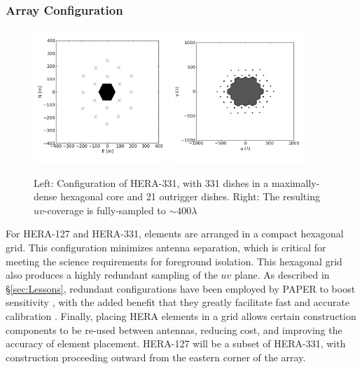\documentclass[preprint]{aastex}
\begin{document}
\subsubsection{Array Configuration}

\begin{figure}[!ht]
\centering
		\includegraphics[width=0.45\textwidth]{plots/HERA_331_pos.png}
		\includegraphics[width=0.45\textwidth]{plots/HERA_331_uv_clipped.png}
\caption{\small
Left: Configuration of HERA-331, with 331 dishes in a maximally-dense hexagonal core and 21 outrigger dishes.  Right: The resulting $uv$-coverage is fully-sampled to $\sim 400\lambda$ %
}\label{fig:uv_coverage}
\end{figure}

For HERA-127 and HERA-331, elements are arranged in a compact hexagonal grid.
This configuration minimizes antenna separation, which is critical for meeting
the science requirements for foreground isolation.  This hexagonal grid also
produces a highly redundant sampling of the $uv$ plane.  As described in
\S\ref{sec:Lessons}, redundant configurations have been employed by PAPER to
boost sensitivity \citep{parsons_et_al2012a}, with the added benefit that they
greatly facilitate fast and accurate calibration
\citep{liu_et_al2010,parsons_et_al2013}.  Finally, placing HERA elements in a
grid allows certain construction components to be re-used between antennas,
reducing cost, and improving the accuracy of element placement.  HERA-127 will
be a subset of HERA-331, with construction proceeding outward from the eastern
corner of the array.
\end{document}

